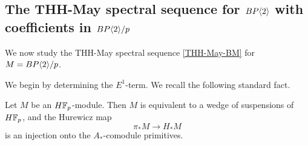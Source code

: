 \subsection{The THH-May spectral sequence for $BP\langle 2 \rangle$ with coefficients in $BP\langle 2 \rangle/p$}


We now study the THH-May spectral sequence \eqref{THH-May-BM} for $M=BP\langle 2 \rangle/p$. 

We begin by determining the $E^1$-term. We recall the following standard fact.
\begin{lem}
	Let $M$ be an $H\mathbb{F}_p$-module. Then $M$ is equivalent to a wedge of suspensions of $H\mathbb{F}_p$, and the Hurewicz map 
	\[
	\pi_*M\to H_*M
	\]
	is an injection onto the $A_*$-comodule primitives.
\end{lem}

